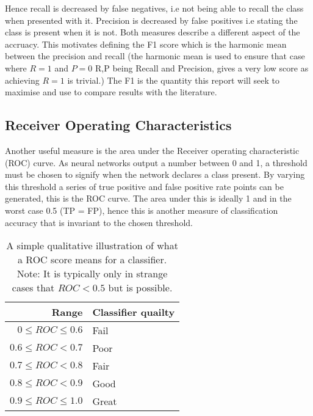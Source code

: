       Hence recall is decreased by false negatives, i.e not being able to recall the class
      when presented with it. Precision is decreased by false positives i.e stating the class
      is present when it is not. Both measures describe a different aspect of the accruacy. This
      motivates defining the F1 score which is the harmonic mean between the precision and recall
      (the harmonic mean is used to ensure that case where $R=1$ and $P=0$ R,P being Recall and Precision, gives
      a very low score  as achieving $R=1$ is trivial.) The F1 is the quantity this report will seek to maximise and use to compare
      results with the literature.
    \subsection{Receiver Operating Characteristics}
      Another useful measure is the area under the Receiver operating characteristic (ROC) curve.
      As neural networks output a number between 0 and 1, a threshold must be chosen to signify
      when the network declares a class present. By varying this threshold a series of true positive and false positive rate points
      can be generated, this is the ROC curve. The area under this is ideally 1 and in the worst case 0.5 (TP = FP), hence this is
      another measure of classification accuracy that is invariant to the chosen threshold.

      \begin{table}[]
        \centering \caption{A simple qualitative illustration of what a ROC score means for a classifier.
        Note: It is typically only in strange cases that $ROC< 0.5$ but is possible.} \label{my-label}
        \begin{tabular}{rl}
          \hline
          Range & Classifier quailty \\ \hline
          $0 \leq ROC \leq 0.6$   & Fail               \\
          $0.6 \leq ROC    < 0.7$   & Poor               \\
          $0.7 \leq ROC    < 0.8$   & Fair               \\
          $0.8 \leq ROC    < 0.9$   & Good               \\
          $0.9 \leq ROC \leq 1.0$   & Great              \\ \hline
        \end{tabular}
    \end{table}
